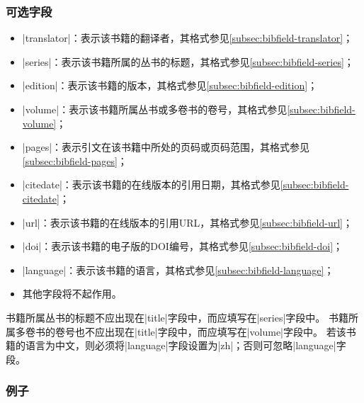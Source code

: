 \subsubsection{可选字段}

\begin{itemize}
\item |translator|：表示该书籍的翻译者，其格式参见\ref{subsec:bibfield-translator}；
\item |series|：表示该书籍所属的丛书的标题，其格式参见\ref{subsec:bibfield-series}；
\item |edition|：表示该书籍的版本，其格式参见\ref{subsec:bibfield-edition}；
\item |volume|：表示该书籍所属丛书或多卷书的卷号，其格式参见\ref{subsec:bibfield-volume}；
\item |pages|：表示引文在该书籍中所处的页码或页码范围，其格式参见\ref{subsec:bibfield-pages}；
\item |citedate|：表示该书籍的在线版本的引用日期，其格式参见\ref{subsec:bibfield-citedate}；
\item |url|：表示该书籍的在线版本的引用URL，其格式参见\ref{subsec:bibfield-url}；
\item |doi|：表示该书籍的电子版的DOI编号，其格式参见\ref{subsec:bibfield-doi}；
\item |language|：表示该书籍的语言，其格式参见\ref{subsec:bibfield-language}；
\item 其他字段将不起作用。
\end{itemize}

\begin{note}
书籍所属丛书的标题不应出现在|title|字段中，而应填写在|series|字段中。
书籍所属多卷书的卷号也不应出现在|title|字段中，而应填写在|volume|字段中。
若该书籍的语言为中文，则必须将|language|字段设置为|zh|；否则可忽略|language|字段。
\end{note}

\subsubsection{例子}

